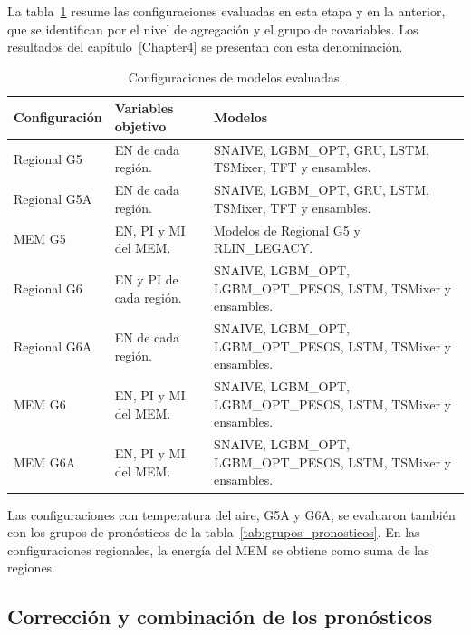 La tabla~\ref{tab:configuraciones} resume las configuraciones evaluadas en esta etapa y en la anterior, que se identifican por el nivel de agregación y el grupo de covariables. Los resultados del capítulo~\ref{Chapter4} se presentan con esta denominación.

\begin{table}[htbp]
	\centering
	\caption{Configuraciones de modelos evaluadas.}
	\label{tab:configuraciones}
	\footnotesize
	\setlength{\tabcolsep}{4pt}
	\renewcommand{\arraystretch}{1.15}
	\begin{tabularx}{\textwidth}{
			@{}
			>{\raggedright\arraybackslash\hsize=0.6\hsize}X
			>{\raggedright\arraybackslash\hsize=0.75\hsize}X
			>{\raggedright\arraybackslash\hsize=1.65\hsize}X
			@{}
		}
		\toprule
		\textbf{Configuración} & \textbf{Variables objetivo} & \textbf{Modelos} \\
		\midrule
		Regional G5 & EN de cada región. & SNAIVE, LGBM\_OPT, GRU, LSTM, TSMixer, TFT y ensambles. \\
		Regional G5A & EN de cada región. & SNAIVE, LGBM\_OPT, GRU, LSTM, TSMixer, TFT y ensambles. \\
		MEM G5 & EN, PI y MI del MEM. & Modelos de Regional G5 y RLIN\_LEGACY. \\
		Regional G6 & EN y PI de cada región. & SNAIVE, LGBM\_OPT, LGBM\_OPT\_PESOS, LSTM, TSMixer y ensambles. \\
		Regional G6A & EN de cada región. & SNAIVE, LGBM\_OPT, LGBM\_OPT\_PESOS, LSTM, TSMixer y ensambles. \\
		MEM G6 & EN, PI y MI del MEM. & SNAIVE, LGBM\_OPT, LGBM\_OPT\_PESOS, LSTM, TSMixer y ensambles. \\
		MEM G6A & EN, PI y MI del MEM. & SNAIVE, LGBM\_OPT, LGBM\_OPT\_PESOS, LSTM, TSMixer y ensambles. \\
		\bottomrule
	\end{tabularx}
\end{table}

Las configuraciones con temperatura del aire, G5A y G6A, se evaluaron también con los grupos de pronósticos de la tabla~\ref{tab:grupos_pronosticos}. En las configuraciones regionales, la energía del MEM se obtiene como suma de las regiones.

\subsection{Corrección y combinación de los pronósticos}
\label{subsec:postproceso}

